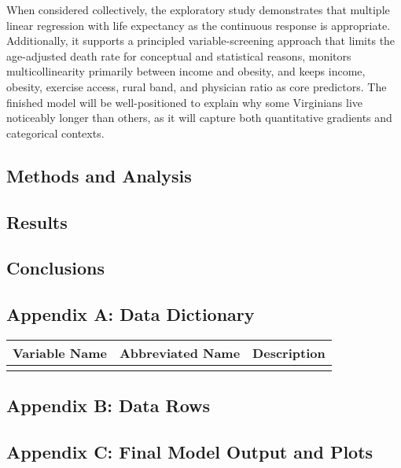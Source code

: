 \documentclass[
  12pt,
]{article}
\begin{document}
When considered collectively, the exploratory study demonstrates that
multiple linear regression with life expectancy as the continuous
response is appropriate. Additionally, it supports a principled
variable-screening approach that limits the age-adjusted death rate for
conceptual and statistical reasons, monitors multicollinearity primarily
between income and obesity, and keeps income, obesity, exercise access,
rural band, and physician ratio as core predictors. The finished model
will be well-positioned to explain why some Virginians live noticeably
longer than others, as it will capture both quantitative gradients and
categorical contexts.

\subsection{Methods and Analysis}\label{methods-and-analysis}

\subsection{Results}\label{results}

\subsection{Conclusions}\label{conclusions}

\newpage

\subsection{Appendix A: Data
Dictionary}\label{appendix-a-data-dictionary}

\begin{longtable}[]{@{}ccc@{}}
\toprule\noalign{}
Variable Name & Abbreviated Name & Description \\
\midrule\noalign{}
\endhead
\bottomrule\noalign{}
\endlastfoot
& & \\
\end{longtable}

\newpage

\subsection{Appendix B: Data Rows}\label{appendix-b-data-rows}

\newpage

\subsection{Appendix C: Final Model Output and
Plots}\label{appendix-c-final-model-output-and-plots}
\end{document}
